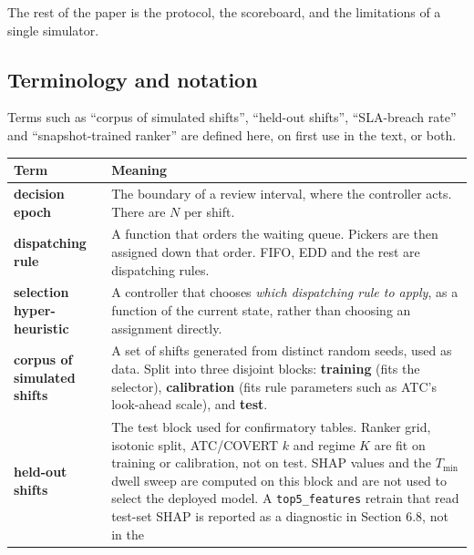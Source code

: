 \documentclass[review,3p,times]{elsarticle}
\newcounter{none}
\theoremstyle{definition}
\begin{document}
The rest of the paper is the protocol, the scoreboard, and the
limitations of a single simulator.

\subsection{Terminology and notation}\label{terminology-and-notation}

Terms such as ``corpus of simulated shifts'', ``held-out shifts'',
``SLA-breach rate'' and ``snapshot-trained ranker'' are defined here, on
first use in the text, or both.

{\def\LTcaptype{none} %
\begin{longtable}[]{@{}
  >{\raggedright\arraybackslash}p{}
  >{\raggedright\arraybackslash}p{}@{}}
\toprule\noalign{}
\begin{minipage}[b]{\linewidth}\raggedright
Term
\end{minipage} & \begin{minipage}[b]{\linewidth}\raggedright
Meaning
\end{minipage} \\
\midrule\noalign{}
\endhead
\bottomrule\noalign{}
\endlastfoot
\textbf{decision epoch} & The boundary of a review interval, where the
controller acts. There are \(N\) per shift. \\
\textbf{dispatching rule} & A function that orders the waiting queue.
Pickers are then assigned down that order. FIFO, EDD and the rest are
dispatching rules. \\
\textbf{selection hyper-heuristic} & A controller that chooses
\emph{which dispatching rule to apply}, as a function of the current
state, rather than choosing an assignment directly. \\
\textbf{corpus of simulated shifts} & A set of shifts generated from
distinct random seeds, used as data. Split into three disjoint blocks:
\textbf{training} (fits the selector), \textbf{calibration} (fits rule
parameters such as ATC's look-ahead scale), and \textbf{test}. \\
\textbf{held-out shifts} & The test block used for confirmatory tables.
Ranker grid, isotonic split, ATC/COVERT \(k\) and regime \(K\) are fit
on training or calibration, not on test. SHAP values and the
\(T_{\min}\) dwell sweep are computed on this block and are not used to
select the deployed model. A \texttt{top5\_features} retrain that read
test-set SHAP is reported as a diagnostic in Section 6.8, not in the

\end{longtable}}
\end{document}
